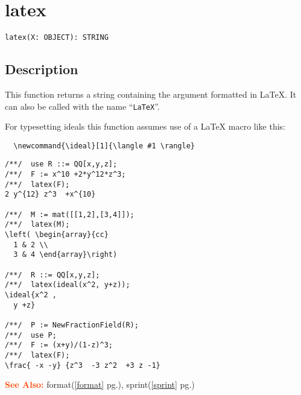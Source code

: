 \documentclass[a4paper]{mybook}
\newenvironment{command}{}{} %
\newcommand\SeeAlso{\par\textcolor{OrangeRed}{\textbf{\large See Also: }}}
\begin{document}
\section{latex}
\label{latex}
\begin{command} %


\begin{Verbatim}[label=syntax, rulecolor=\color{MidnightBlue},
frame=single]
latex(X: OBJECT): STRING
\end{Verbatim}


\subsection*{Description}

This function returns a string containing the argument formatted in LaTeX.
It can also be called with the name ``\verb&LaTeX&''.
\par 
For typesetting ideals this function assumes use of a LaTeX macro like this:
\begin{verbatim}
  \newcommand{\ideal}[1]{\langle #1 \rangle}
\end{verbatim}
\begin{Verbatim}[label=example, rulecolor=\color{PineGreen}, frame=single]
/**/  use R ::= QQ[x,y,z];
/**/  F := x^10 +2*y^12*z^3;
/**/  latex(F);
2 y^{12} z^3  +x^{10} 

/**/  M := mat([[1,2],[3,4]]);
/**/  latex(M);
\left( \begin{array}{cc}
  1 & 2 \\
  3 & 4 \end{array}\right)

/**/  R ::= QQ[x,y,z];
/**/  latex(ideal(x^2, y+z));
\ideal{x^2 ,
  y +z}

/**/  P := NewFractionField(R);
/**/  use P;
/**/  F := (x+y)/(1-z)^3;
/**/  latex(F);
\frac{ -x -y} {z^3  -3 z^2  +3 z -1}
\end{Verbatim}


\SeeAlso %
  format(\ref{format} pg.\pageref{format}), 
    sprint(\ref{sprint} pg.\pageref{sprint})
\end{command} %
\end{document}
